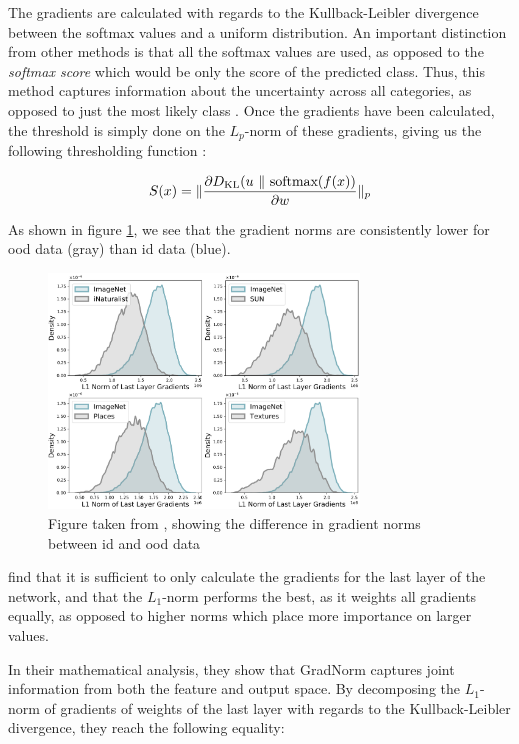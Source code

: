 \documentclass[UKenglish]{uiomasterthesis} %
\theoremstyle{definition}
\begin{document}
The gradients are calculated with regards to the Kullback-Leibler divergence between the softmax values and a uniform distribution. An important distinction from other methods is that all the softmax values are used, as opposed to the {\it softmax score} which would be only the score of the predicted class. Thus, this method captures information about the uncertainty across all categories, as opposed to just the most likely class \cite[3]{gradnorm}. Once the gradients have been calculated, the threshold is simply done on the $L_p$-norm of these gradients, giving us the following thresholding function \cite{gradnorm}:

\begin{equation}
\label{eq:score}
    S(\*x) = \lVert\frac{\partial D_\text{KL}(\*u~\lVert~\text{softmax}(f(\*x))}{\partial \*w}  \rVert_p
\end{equation}

As shown in figure \ref{gradnorms}, we see that the gradient norms are consistently lower for \ac{ood} data (gray) than \ac{id} data (blue).

\begin{figure}[h]
\centerline{\includegraphics[width=3.25in]{figure/gradnorm.pdf}}
\caption{Figure taken from \cite{gradnorm}, showing the difference in gradient norms between \ac{id} and \ac{ood} data}
\label{gradnorms}
\end{figure}

\cite{gradnorm} find that it is sufficient to only calculate the gradients for the last layer of the network, and that the $L_1$-norm performs the best, as it weights all gradients equally, as opposed to higher norms which place more importance on larger values.

In their mathematical analysis, they show that GradNorm captures joint information from both the feature and output space. By decomposing the $L_1$-norm of gradients of weights of the last layer with regards to the Kullback-Leibler divergence, they reach the following equality:
\end{document}
